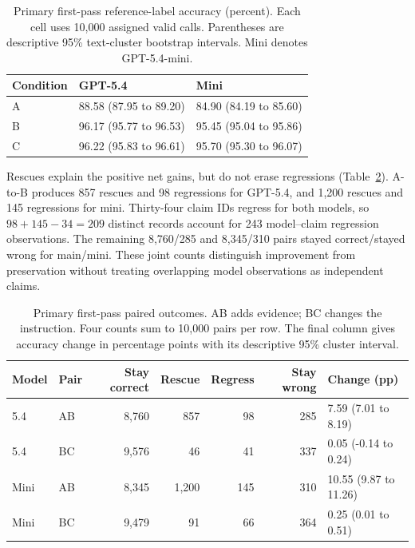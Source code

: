 \documentclass[11pt,letterpaper]{article}
\begin{document}
\begin{table}[htbp]\centering\small
\caption{Primary first-pass reference-label accuracy (percent). Each cell uses 10,000 assigned valid calls. Parentheses are descriptive 95\% text-cluster bootstrap intervals. Mini denotes GPT-5.4-mini.}\label{tab:accuracy}
\begin{tabularx}{\linewidth}{lXX}\toprule
Condition & GPT-5.4 & Mini \\\midrule
A & 88.58 (87.95 to 89.20) & 84.90 (84.19 to 85.60) \\
B & 96.17 (95.77 to 96.53) & 95.45 (95.04 to 95.86) \\
C & 96.22 (95.83 to 96.61) & 95.70 (95.30 to 96.07) \\
\bottomrule
\end{tabularx}
\end{table}

Rescues explain the positive net gains, but do not erase regressions (Table~\ref{tab:transitions}). A-to-B produces 857 rescues and 98 regressions for GPT-5.4, and 1,200 rescues and 145 regressions for mini. Thirty-four claim IDs regress for both models, so $98+145-34=209$ distinct records account for 243 model--claim regression observations. The remaining 8,760/285 and 8,345/310 pairs stayed correct/stayed wrong for main/mini. These joint counts distinguish improvement from preservation without treating overlapping model observations as independent claims.

\begin{table}[htbp]\centering\small
\caption{Primary first-pass paired outcomes. AB adds evidence; BC changes the instruction. Four counts sum to 10,000 pairs per row. The final column gives accuracy change in percentage points with its descriptive 95\% cluster interval.}\label{tab:transitions}
\begin{tabularx}{\linewidth}{llrrrrX}\toprule
Model & Pair & Stay correct & Rescue & Regress & Stay wrong & Change (pp) \\\midrule
5.4 & AB & 8,760 & 857 & 98 & 285 & 7.59 (7.01 to 8.19) \\
5.4 & BC & 9,576 & 46 & 41 & 337 & 0.05 (-0.14 to 0.24) \\
Mini & AB & 8,345 & 1,200 & 145 & 310 & 10.55 (9.87 to 11.26) \\
Mini & BC & 9,479 & 91 & 66 & 364 & 0.25 (0.01 to 0.51) \\
\bottomrule
\end{tabularx}
\end{table}
\end{document}
